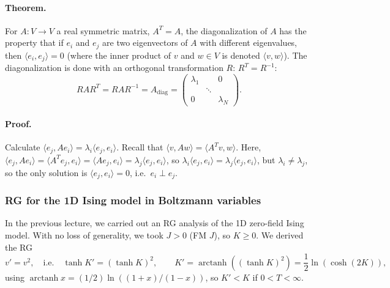 \paragraph{Theorem.} For $A:V\to V$ a real symmetric matrix, $A^T = A$, the diagonalization of $A$ has the
property that if $e_i$ and $e_j$ are two eigenvectors of $A$ with different eigenvalues, then
$\langle e_i,e_j\rangle = 0$ (where the inner product of $v$ and $w\in V$ is denoted
$\langle v,w\rangle$). The diagonalization is done with an orthogonal transformation $R$:
$R^T = R^{-1}$:
\begin{equation}
  RAR^T = RAR^{-1} = A_{\text{diag}} = \begin{pmatrix}\lambda_1 & & 0\\ & \ddots & \\ 0 & & \lambda_N\end{pmatrix}.
\end{equation}

\paragraph{Proof.} Calculate $\langle e_j,Ae_i\rangle = \lambda_i\langle e_j,e_i\rangle$. Recall that
$\langle v,Aw\rangle = \langle A^Tv,w\rangle$. Here,
$\langle e_j,Ae_i\rangle = \langle A^Te_j,e_i\rangle = \langle Ae_j,e_i\rangle = \lambda_j\langle e_j,e_i\rangle$,
so $\lambda_i\langle e_j,e_i\rangle = \lambda_j\langle e_j,e_i\rangle$, but $\lambda_i\ne\lambda_j$, so the only
solution is $\langle e_j,e_i\rangle = 0$, i.e.\ $e_i\perp e_j$.

\subsubsection*{RG for the 1D Ising model in Boltzmann variables}

In the previous lecture, we carried out an RG analysis of the 1D zero-field Ising model. With no loss of
generality, we took $J>0$ (FM $J$), so $K\ge 0$. We derived the RG
\begin{equation}
  v' = v^2,\quad\text{i.e.}\quad \tanh K' = (\tanh K)^2,\qquad
  K' = \operatorname{arctanh}\left((\tanh K)^2\right) = \frac{1}{2}\ln(\cosh(2K)),
\end{equation}
using $\operatorname{arctanh}x = (1/2)\ln\left((1+x)/(1-x)\right)$, so $K'<K$ if $0<T<\infty$.

